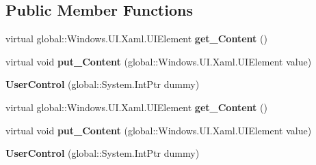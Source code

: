 \subsection*{Public Member Functions}
\begin{DoxyCompactItemize}
\item 
\mbox{\label{class_windows_1_1_u_i_1_1_xaml_1_1_controls_1_1_user_control_a53c73d0b641c4a441f1d32f8eadecaa4}} 
virtual global\+::\+Windows.\+U\+I.\+Xaml.\+U\+I\+Element {\bfseries get\+\_\+\+Content} ()
\item 
\mbox{\label{class_windows_1_1_u_i_1_1_xaml_1_1_controls_1_1_user_control_a5ec8d8927fff6f65232539dd290d7686}} 
virtual void {\bfseries put\+\_\+\+Content} (global\+::\+Windows.\+U\+I.\+Xaml.\+U\+I\+Element value)
\item 
\mbox{\label{class_windows_1_1_u_i_1_1_xaml_1_1_controls_1_1_user_control_a5b671a79ac14225d5319c77623284ace}} 
{\bfseries User\+Control} (global\+::\+System.\+Int\+Ptr dummy)
\item 
\mbox{\label{class_windows_1_1_u_i_1_1_xaml_1_1_controls_1_1_user_control_a53c73d0b641c4a441f1d32f8eadecaa4}} 
virtual global\+::\+Windows.\+U\+I.\+Xaml.\+U\+I\+Element {\bfseries get\+\_\+\+Content} ()
\item 
\mbox{\label{class_windows_1_1_u_i_1_1_xaml_1_1_controls_1_1_user_control_a5ec8d8927fff6f65232539dd290d7686}} 
virtual void {\bfseries put\+\_\+\+Content} (global\+::\+Windows.\+U\+I.\+Xaml.\+U\+I\+Element value)
\item 
\mbox{\label{class_windows_1_1_u_i_1_1_xaml_1_1_controls_1_1_user_control_a5b671a79ac14225d5319c77623284ace}} 
{\bfseries User\+Control} (global\+::\+System.\+Int\+Ptr dummy)
\item 
\mbox{\label{class_windows_1_1_u_i_1_1_xaml_1_1_controls_1_1_user_control_a53c73d0b641c4a441f1d32f8eadecaa4}} 

\end{DoxyCompactItemize}
